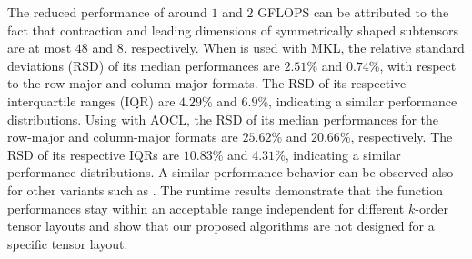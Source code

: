 The reduced performance of around $1$ and $2$ GFLOPS can be attributed to the fact that contraction and leading dimensions of symmetrically shaped subtensors are at most $48$ and $8$, respectively.
When  is used with MKL, the relative standard deviations (RSD) of its median performances are $2.51$\% and $0.74$\%, with respect to the row-major and column-major formats.
The RSD of its respective interquartile ranges (IQR) are $4.29$\% and $6.9$\%, indicating a similar performance distributions.
Using  with AOCL, the RSD of its median performances for the row-major and column-major formats are $25.62$\% and $20.66$\%, respectively.
The RSD of its respective IQRs are $10.83$\% and $4.31$\%, indicating a similar performance distributions.
A similar performance behavior can be observed also for other  variants such as .
The runtime results demonstrate that the function performances stay within an acceptable range independent for different $k$-order tensor layouts and show that our proposed algorithms are not designed for a specific tensor layout.


